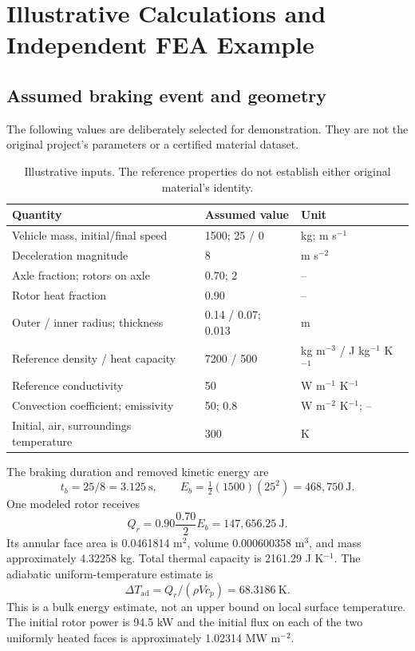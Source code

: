 \documentclass[11pt,a4paper]{article}
\newcommand{\sectionpage}[1]{\clearpage\section{#1}}
\begin{document}
\sectionpage{Illustrative Calculations and Independent FEA Example}
\subsection{Assumed braking event and geometry}
The following values are deliberately selected for demonstration. They are not the original project's parameters or a certified material dataset.
\begin{table}[h!]\centering\small
\begin{tabularx}{\textwidth}{@{}lXl@{}}\toprule
Quantity & Assumed value & Unit\\\midrule
Vehicle mass, initial/final speed & 1500; 25 / 0 & kg; m s$^{-1}$\\
Deceleration magnitude & 8 & m s$^{-2}$\\
Axle fraction; rotors on axle & 0.70; 2 & --\\
Rotor heat fraction & 0.90 & --\\
Outer / inner radius; thickness & 0.14 / 0.07; 0.013 & m\\
Reference density / heat capacity & 7200 / 500 & kg m$^{-3}$ / J kg$^{-1}$ K$^{-1}$\\
Reference conductivity & 50 & W m$^{-1}$ K$^{-1}$\\
Convection coefficient; emissivity & 50; 0.8 & W m$^{-2}$ K$^{-1}$; --\\
Initial, air, surroundings temperature & 300 & K\\\bottomrule
\end{tabularx}
\caption{Illustrative inputs. The reference properties do not establish either original material's identity.}
\end{table}

The braking duration and removed kinetic energy are
\begin{equation}
t_b=25/8=3.125\ \mathrm{s},\qquad E_b=\tfrac12(1500)(25^2)=468{,}750\ \mathrm{J}.
\end{equation}
One modeled rotor receives
\begin{equation}
Q_r=0.90\frac{0.70}{2}E_b=147{,}656.25\ \mathrm{J}.
\end{equation}
Its annular face area is 0.0461814 m$^2$, volume 0.000600358 m$^3$, and mass approximately 4.32258 kg. Total thermal capacity is 2161.29 J K$^{-1}$. The adiabatic uniform-temperature estimate is
\begin{equation}
\Delta T_{\mathrm{ad}}=Q_r/(\rho Vc_p)=68.3186\ \mathrm{K}.
\end{equation}
This is a bulk energy estimate, not an upper bound on local surface temperature. The initial rotor power is 94.5 kW and the initial flux on each of the two uniformly heated faces is approximately 1.02314 MW m$^{-2}$.
\end{document}
